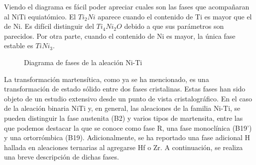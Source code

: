 \documentclass[12pt]{article}
\theoremstyle{definition}
\theoremstyle{remark}
\begin{document}
Viendo el diagrama es fácil poder apreciar cuales son las fases que acompañaran al NiTi equiatómico. El $Ti_2Ni$ aparece cuando el contenido de Ti es mayor que el de Ni. Es difícil distinguir del $Ti_4Ni_2O$ debido a que sus parámetros son parecidos. Por otra parte, cuando el contenido de Ni es mayor, la única fase estable es $TiNi_3$.

\begin{figure}[H]
	\centering
	\caption{Diagrama de fases de la aleación Ni-Ti}
	\label{PhaseDiagram}
\end{figure}

La transformación martensítica, como ya se ha mencionado, es una transformación de estado sólido entre dos fases cristalinas. Estas fases han sido objeto de un estudio extensivo desde un punto de vista cristalográfico. En el caso de la aleación binaria NiTi y, en general, las aleaciones de la familia Ni-Ti, se pueden distinguir la fase austenita (B2) y varios tipos de martensita, entre las que podemos destacar la que se conoce como fase R, una fase monoclínica (B19’) y una ortorrómbica (B19). Adicionalmente, se ha reportado una fase adicional H hallada en aleaciones ternarias al agregarse Hf o Zr. A continuación, se realiza una breve descripción de dichas fases.
\end{document}
